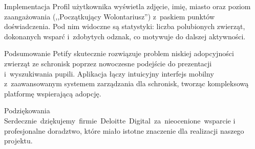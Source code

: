 \documentclass[final]{beamer} %
\begin{document}
\begin{frame}{}
\begin{columns}[T]
\begin{column}[T]{0.48\textwidth}
\begin{block}{Implementacja}
Profil użytkownika wyświetla zdjęcie, imię, miasto oraz poziom zaangażowania (,,Początkujący Wolontariusz'') z~paskiem punktów doświadczenia. Pod nim widoczne są statystyki: liczba polubionych zwierząt, dokonanych wsparć i~zdobytych odznak, co motywuje do dalszej aktywności.
\end{block}
\begin{block}{Podsumowanie}
\justifying
Petify skutecznie rozwiązuje problem niskiej adopcyjności zwierząt ze schronisk poprzez nowoczesne podejście do prezentacji i~wyszukiwania pupili. Aplikacja łączy intuicyjny interfejs mobilny z~zaawansowanym systemem zarządzania dla schronisk, tworząc kompleksową platformę wspierającą adopcję.
\end{block}
\begin{block}{Podziękowania}
Serdecznie~dziękujemy~firmie~Deloitte~Digital~za~nieocenione~wsparcie i profesjonalne doradztwo, które miało istotne znaczenie dla realizacji naszego projektu.
\end{block}
\end{column}
\end{columns}
    \vfill
\end{frame}
\end{document}
